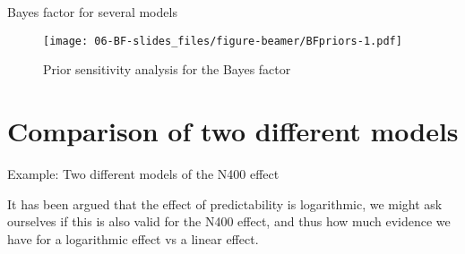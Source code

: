 \documentclass[12pt,ignorenonframetext,aspectratio=169]{beamer}
\newenvironment{Shaded}{\begin{snugshade}}{\end{snugshade}}
\newcommand{\DataTypeTok}[1]{\textcolor[rgb]{0.13,0.29,0.53}{#1}}
\newcommand{\KeywordTok}[1]{\textcolor[rgb]{0.13,0.29,0.53}{\textbf{#1}}}
\newcommand{\NormalTok}[1]{#1}
\newcommand{\OperatorTok}[1]{\textcolor[rgb]{0.81,0.36,0.00}{\textbf{#1}}}
\newcommand{\StringTok}[1]{\textcolor[rgb]{0.31,0.60,0.02}{#1}}
\begin{document}
\begin{frame}[fragile]{Bayes factor for several models}
\end{frame}

\begin{frame}

\begin{figure}
\centering
\texttt{[image: 06-BF-slides\_files/figure-beamer/BFpriors-1.pdf]}
\caption{\label{fig:BFpriors}Prior sensitivity analysis for the Bayes factor}
\end{figure}

\end{frame}

\hypertarget{comparison-of-two-different-models}{%
\section{Comparison of two different models}\label{comparison-of-two-different-models}}

\begin{frame}[fragile]{Example: Two different models of the N400 effect}
\protect\hypertarget{example-two-different-models-of-the-n400-effect}{}

It has been argued that the effect of predictability is logarithmic, we might ask ourselves if this is also valid for the N400 effect, and thus how much evidence we have for a logarithmic effect vs a linear effect.

\footnotesize

\begin{Shaded}
\end{Shaded}

\end{frame}
\end{document}
